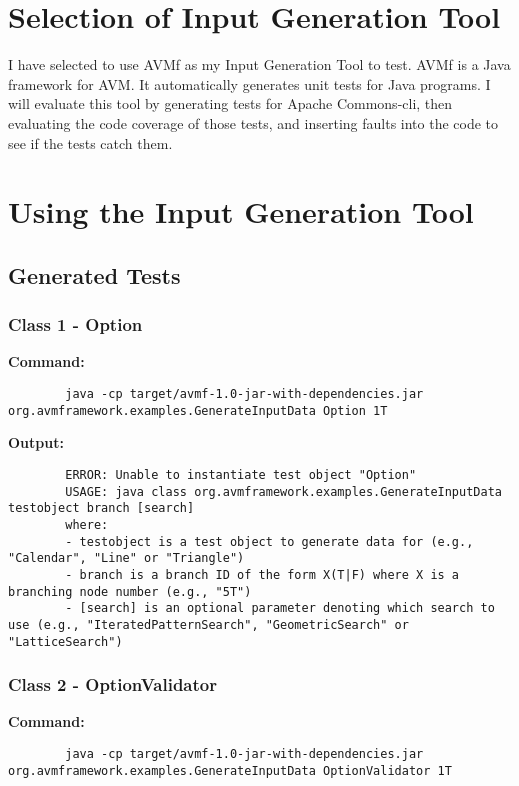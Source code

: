 \documentclass[letterpaper,10pt]{article}
\begin{document}
\section{Selection of Input Generation Tool}
I have selected to use AVMf as my Input Generation Tool to test. AVMf is a Java framework for AVM.
 It automatically generates unit tests for Java programs. I will evaluate this tool by 
generating tests for Apache Commons-cli, then evaluating the code coverage of those tests, and 
inserting faults into the code to see if the tests catch them.

\section{Using the Input Generation Tool}
	\subsection{Generated Tests}
		\subsubsection{Class 1 - Option}
		\textbf{Command: }
		\begin{lstlisting}
		java -cp target/avmf-1.0-jar-with-dependencies.jar org.avmframework.examples.GenerateInputData Option 1T
		\end{lstlisting}

		\textbf{Output: }
		\begin{lstlisting}
		ERROR: Unable to instantiate test object "Option"
		USAGE: java class org.avmframework.examples.GenerateInputData testobject branch [search] 
		where: 
		- testobject is a test object to generate data for (e.g., "Calendar", "Line" or "Triangle")
		- branch is a branch ID of the form X(T|F) where X is a branching node number (e.g., "5T")
		- [search] is an optional parameter denoting which search to use (e.g., "IteratedPatternSearch", "GeometricSearch" or "LatticeSearch")
		\end{lstlisting}

		\subsubsection{Class 2 - OptionValidator}
		\textbf{Command: }
		\begin{lstlisting}
		java -cp target/avmf-1.0-jar-with-dependencies.jar org.avmframework.examples.GenerateInputData OptionValidator 1T
		\end{lstlisting}
\end{document}
